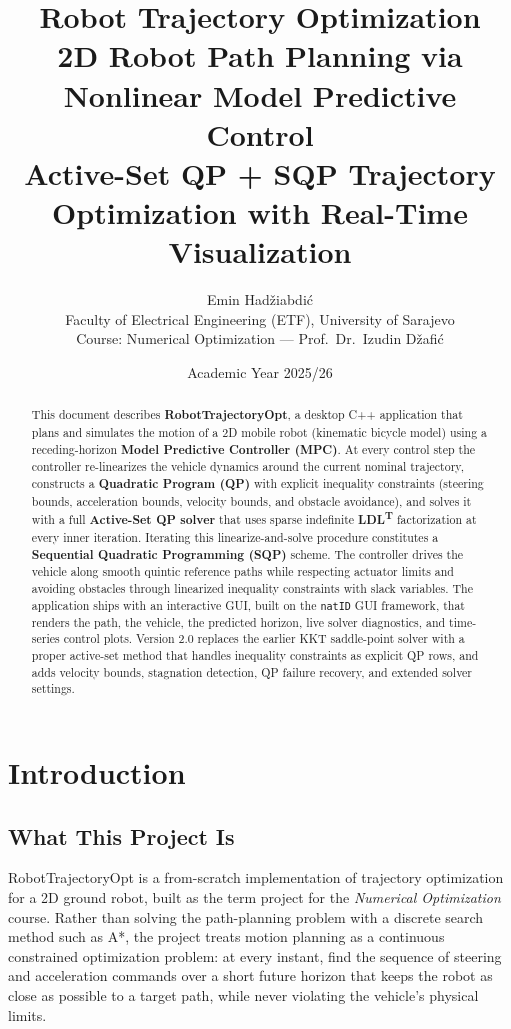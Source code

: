 ﻿\documentclass[11pt,a4paper]{article}
\title{\textbf{Robot Trajectory Optimization}\\[0.3cm]
\large 2D Robot Path Planning via Nonlinear Model Predictive Control\\
\large Active-Set QP + SQP Trajectory Optimization with Real-Time Visualization}
\author{Emin Had\v{z}iabdi\'c \\ \small Faculty of Electrical Engineering (ETF), University of Sarajevo \\ \small Course: Numerical Optimization --- Prof.\ Dr.\ Izudin D\v{z}afi\'c}
\date{Academic Year 2025/26}
\begin{document}
\maketitle

\begin{abstract}
\noindent This document describes \textbf{RobotTrajectoryOpt}, a desktop C++ application that plans and simulates the motion of a 2D mobile robot (kinematic bicycle model) using a receding-horizon \textbf{Model Predictive Controller (MPC)}. At every control step the controller re-linearizes the vehicle dynamics around the current nominal trajectory, constructs a \textbf{Quadratic Program (QP)} with explicit inequality constraints (steering bounds, acceleration bounds, velocity bounds, and obstacle avoidance), and solves it with a full \textbf{Active-Set QP solver} that uses sparse indefinite \textbf{LDL\textsuperscript{T}} factorization at every inner iteration. Iterating this linearize-and-solve procedure constitutes a \textbf{Sequential Quadratic Programming (SQP)} scheme. The controller drives the vehicle along smooth quintic reference paths while respecting actuator limits and avoiding obstacles through linearized inequality constraints with slack variables. The application ships with an interactive GUI, built on the \texttt{natID} GUI framework, that renders the path, the vehicle, the predicted horizon, live solver diagnostics, and time-series control plots. Version 2.0 replaces the earlier KKT saddle-point solver with a proper active-set method that handles inequality constraints as explicit QP rows, and adds velocity bounds, stagnation detection, QP failure recovery, and extended solver settings.
\end{abstract}

\tableofcontents
\newpage
\section{Introduction}

\subsection{What This Project Is}
RobotTrajectoryOpt is a from-scratch implementation of trajectory optimization for a 2D ground robot, built as the term project for the \emph{Numerical Optimization} course. Rather than solving the path-planning problem with a discrete search method such as A*, the project treats motion planning as a continuous constrained optimization problem: at every instant, find the sequence of steering and acceleration commands over a short future horizon that keeps the robot as close as possible to a target path, while never violating the vehicle's physical limits.
\end{document}
